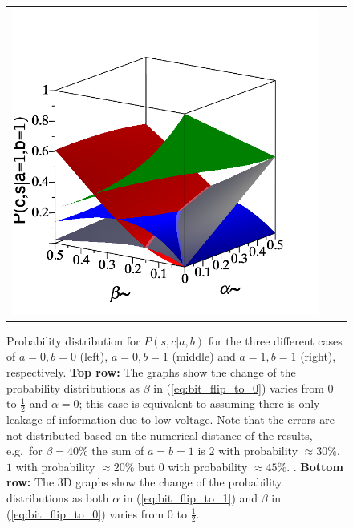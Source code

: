 \begin{figure}
\begin{tabular}{ccc}
        \includegraphics[width=.3\textwidth]{media/noisy_half_adder_value_full_dist_11.png} \\        
    \end{tabular}
    \caption{Probability distribution for $P(s,c|a,b)$ for the three different cases of $a=0, b=0$ (left), $a=0, b=1$ (middle) and $a=1, b=1$ (right), respectively. {\bf Top row:} The graphs show the change of the probability distributions as $\beta$ in (\ref{eq:bit_flip_to_0}) varies from $0$ to $\frac{1}{2}$ and $\alpha = 0$; this case is equivalent to assuming there is only leakage of information due to low-voltage. Note that the errors are not distributed based on the numerical distance of the results, e.g.\ for $\beta=40\%$ the sum of $a=b=1$ is $2$ with probability $\approx 30\%$, $1$ with probability $\approx 20\%$ but $0$ with probability $\approx 45\%$. \label{fig:noise_prob_dist}. {\bf Bottom row:} The 3D graphs show the change of the probability distributions as both $\alpha$ in (\ref{eq:bit_flip_to_1}) and $\beta$ in (\ref{eq:bit_flip_to_0}) varies from $0$ to $\frac{1}{2}$.}
\end{figure}
